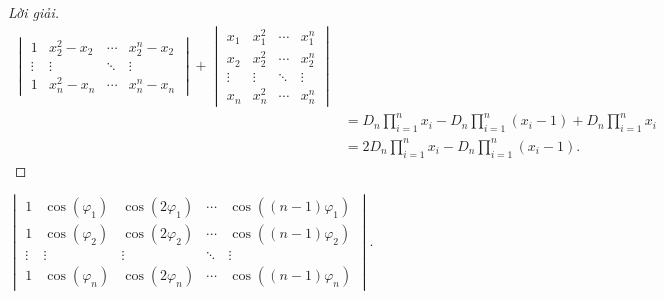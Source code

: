 \documentclass[class=linearalgebra,crop=false]{standalone}
\begin{document}
\begin{proof}[Lời giải]
\begin{align*}
\begin{vmatrix}
            1      & x_{2}^{2} - x_{2} & \cdots & x_{2}^{n} - x_{2} \\
            \vdots & \vdots            & \ddots & \vdots            \\
            1      & x_{n}^{2} - x_{n} & \cdots & x_{n}^{n} - x_{n}
        \end{vmatrix}
        +
        \begin{vmatrix}
            x_{1}  & x_{1}^{2} & \cdots & x_{1}^{n} \\
            x_{2}  & x_{2}^{2} & \cdots & x_{2}^{n} \\
            \vdots & \vdots    & \ddots & \vdots    \\
            x_{n}  & x_{n}^{2} & \cdots & x_{n}^{n}
        \end{vmatrix}                                                      \\
         & = D_{n}\prod^{n}_{i=1}x_{i} - D_{n}\prod^{n}_{i=1}(x_{i} - 1) + D_{n}\prod^{n}_{i=1}x_{i} \\
         & = 2D_{n}\prod^{n}_{i=1}x_{i} - D_{n}\prod^{n}_{i=1}(x_{i} - 1).
    \end{align*}
    \endgroup
\end{proof}

\begin{exercise}
    $\begin{vmatrix}
            1      & \cos(\varphi_{1}) & \cos(2\varphi_{1}) & \cdots & \cos((n-1)\varphi_{1}) \\
            1      & \cos(\varphi_{2}) & \cos(2\varphi_{2}) & \cdots & \cos((n-1)\varphi_{2}) \\
            \vdots & \vdots            & \vdots             & \ddots & \vdots                 \\
            1      & \cos(\varphi_{n}) & \cos(2\varphi_{n}) & \cdots & \cos((n-1)\varphi_{n})
        \end{vmatrix}$.
\end{exercise}
\end{document}
